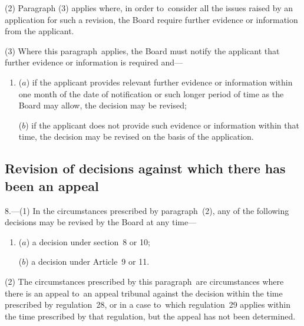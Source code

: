 \documentclass[12pt,a4paper]{article}
\begin{document}
(2) Paragraph (3) applies where, in order to~consider all the issues raised by an application for such a revision, the Board require further evidence or information from the applicant.

(3) Where this paragraph~applies, the Board must notify the applicant that further evidence or information is required and—
\begin{enumerate}\item[]
($a$) if the applicant provides relevant further evidence or information within one month of the date of notification or such longer period of time as the Board may allow, the decision may be revised;

($b$) if the applicant does not provide such evidence or information within that time, the decision may be revised on the basis of the application.
\end{enumerate}

\subsection[8. Revision of decisions against which there has been an appeal]{Revision of decisions against which there has been an appeal}

8.---(1)  In the circumstances prescribed by paragraph~(2), any of the following decisions may be revised by the Board at any time—
\begin{enumerate}\item[]
($a$) a decision under section~8 or 10;

($b$) a decision under Article~9 or 11.
\end{enumerate}

(2) The circumstances prescribed by this paragraph~are circumstances where there is an appeal to~an appeal tribunal against the decision within the time prescribed by regulation~28, or in a case to~which regulation~29 applies within the time prescribed by that regulation, but the appeal has not been determined.
\end{document}
